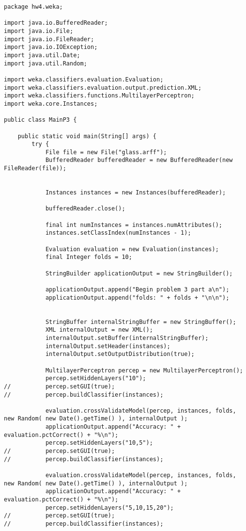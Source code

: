 \begin{lstlisting}
package hw4.weka;

import java.io.BufferedReader;
import java.io.File;
import java.io.FileReader;
import java.io.IOException;
import java.util.Date;
import java.util.Random;

import weka.classifiers.evaluation.Evaluation;
import weka.classifiers.evaluation.output.prediction.XML;
import weka.classifiers.functions.MultilayerPerceptron;
import weka.core.Instances;

public class MainP3 {
	
	public static void main(String[] args) {
		try {
			File file = new File("glass.arff");
			BufferedReader bufferedReader = new BufferedReader(new FileReader(file));
			
			
			Instances instances = new Instances(bufferedReader);
			
			bufferedReader.close();
			
			final int numInstances = instances.numAttributes();			
			instances.setClassIndex(numInstances - 1);
			
			Evaluation evaluation = new Evaluation(instances);
			final Integer folds = 10;

			StringBuilder applicationOutput = new StringBuilder();

			applicationOutput.append("Begin problem 3 part a\n");
			applicationOutput.append("folds: " + folds + "\n\n");

				
			StringBuffer internalStringBuffer = new StringBuffer();
			XML internalOutput = new XML();
			internalOutput.setBuffer(internalStringBuffer);
			internalOutput.setHeader(instances);
			internalOutput.setOutputDistribution(true);
			
			MultilayerPerceptron percep = new MultilayerPerceptron();
			percep.setHiddenLayers("10");
//			percep.setGUI(true);
//			percep.buildClassifier(instances);
			
			evaluation.crossValidateModel(percep, instances, folds, new Random( new Date().getTime() ), internalOutput );
			applicationOutput.append("Accuracy: " + evaluation.pctCorrect() + "%\n");
			percep.setHiddenLayers("10,5");
//			percep.setGUI(true);
//			percep.buildClassifier(instances);
			
			evaluation.crossValidateModel(percep, instances, folds, new Random( new Date().getTime() ), internalOutput );
			applicationOutput.append("Accuracy: " + evaluation.pctCorrect() + "%\n");
			percep.setHiddenLayers("5,10,15,20");
//			percep.setGUI(true);
//			percep.buildClassifier(instances);
			

\end{lstlisting}
